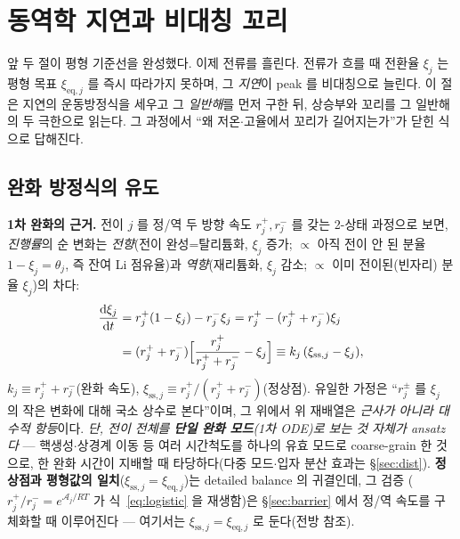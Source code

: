 \documentclass[11pt,a4paper]{article}
\newcommand{\dd}{\mathrm{d}}
\newcommand{\eq}{\mathrm{eq}}
\newcommand{\sstat}{\mathrm{ss}}
\begin{document}
\section{동역학 지연과 비대칭 꼬리}\label{sec:lag}
앞 두 절이 평형 기준선을 완성했다. 이제 전류를 흘린다. 전류가 흐를 때 전환율 $\xi_j$ 는 평형 목표
$\xi_{\eq,j}$ 를 즉시 따라가지 못하며, 그 \emph{지연}이 peak 를 비대칭으로 늘린다. 이 절은 지연의 운동방정식을
세우고 그 \emph{일반해}를 먼저 구한 뒤, 상승부와 꼬리를 그 일반해의 두 극한으로 읽는다. 그 과정에서 ``왜
저온$\cdot$고율에서 꼬리가 길어지는가''가 닫힌 식으로 답해진다.

\subsection{완화 방정식의 유도}
\textbf{1차 완화의 근거.} 전이 $j$ 를 정/역 두 방향 속도 $r_j^+,r_j^-$ 를 갖는 2-상태 과정으로 보면, \emph{진행률}의
순 변화는 \emph{전향}(전이 완성=탈리튬화, $\xi_j$ 증가; $\propto$ 아직 전이 안 된 분율 $1-\xi_j=\theta_j$, 즉 잔여 Li
점유율)과 \emph{역향}(재리튬화, $\xi_j$ 감소; $\propto$ 이미 전이된(빈자리) 분율 $\xi_j$)의 차다:
\begin{align}
\frac{\dd\xi_j}{\dd t}&=r_j^+(1-\xi_j)-r_j^-\xi_j
=r_j^+-(r_j^++r_j^-)\xi_j\notag\\
&=(r_j^++r_j^-)\Big[\frac{r_j^+}{r_j^++r_j^-}-\xi_j\Big]
\equiv k_j\,(\xi_{\sstat,j}-\xi_j),
\label{eq:relax}
\end{align}
$k_j\equiv r_j^++r_j^-$(완화 속도), $\xi_{\sstat,j}\equiv r_j^+/(r_j^++r_j^-)$(정상점). 유일한 가정은 ``$r_j^\pm$ 를
$\xi_j$ 의 작은 변화에 대해 국소 상수로 본다''이며, 그 위에서 위 재배열은 \emph{근사가 아니라 대수적 항등}이다.
\emph{단, 전이 전체를 \textbf{단일 완화 모드}(1차 ODE)로 보는 것 자체가 ansatz 다} — 핵생성$\cdot$상경계 이동 등
여러 시간척도를 하나의 유효 모드로 coarse-grain 한 것으로, 한 완화 시간이 지배할 때 타당하다(다중 모드$\cdot$입자
분산 효과는 \S\ref{sec:dist}).
\textbf{정상점과 평형값의 일치}($\xi_{\sstat,j}=\xi_{\eq,j}$)는 detailed balance 의 귀결인데, 그 검증
($r_j^+/r_j^-=e^{\mathcal A_j/RT}$ 가 식~\eqref{eq:logistic} 을 재생함)은 \S\ref{sec:barrier} 에서 정/역 속도를
구체화할 때 이루어진다 — 여기서는 $\xi_{\sstat,j}=\xi_{\eq,j}$ 로 둔다(전방 참조).
\end{document}
